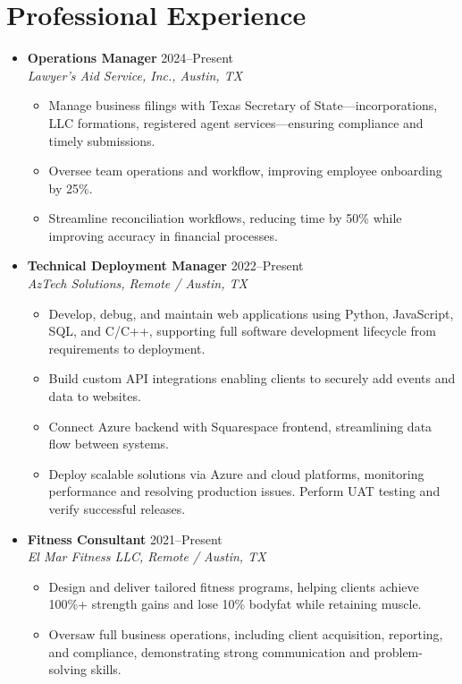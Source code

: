 \documentclass[letterpaper,10pt]{article}
\newcommand{\resumeItem}[1]{\item \small{#1}}
\begin{document}
\section*{Professional Experience}
\begin{itemize}
  \item[]
    \textbf{Operations Manager} \hfill 2024--Present \\
    \textit{Lawyer's Aid Service, Inc., Austin, TX}
  \begin{itemize}
    \resumeItem{Manage business filings with Texas Secretary of State---incorporations, LLC formations, registered agent services---ensuring compliance and timely submissions.}
    \resumeItem{Oversee team operations and workflow, improving employee onboarding by 25\%.}
    \resumeItem{Streamline reconciliation workflows, reducing time by 50\% while improving accuracy in financial processes.}
  \end{itemize}

  \item[]
    \textbf{Technical Deployment Manager} \hfill 2022--Present \\
    \textit{AzTech Solutions, Remote / Austin, TX}
  \begin{itemize}
    \resumeItem{Develop, debug, and maintain web applications using Python, JavaScript, SQL, and C/C++, supporting full software development lifecycle from requirements to deployment.}
    \resumeItem{Build custom API integrations enabling clients to securely add events and data to websites.}
    \resumeItem{Connect Azure backend with Squarespace frontend, streamlining data flow between systems.}
    \resumeItem{Deploy scalable solutions via Azure and cloud platforms, monitoring performance and resolving production issues. Perform UAT testing and verify successful releases.}
  \end{itemize}

  \item[]
    \textbf{Fitness Consultant} \hfill 2021--Present \\
    \textit{El Mar Fitness LLC, Remote / Austin, TX}
  \begin{itemize}
    \resumeItem{Design and deliver tailored fitness programs, helping clients achieve 100\%+ strength gains and lose 10\% bodyfat while retaining muscle.}
    \resumeItem{Oversaw full business operations, including client acquisition, reporting, and compliance, demonstrating strong communication and problem-solving skills.}
  \end{itemize}
\end{itemize}
\end{document}
